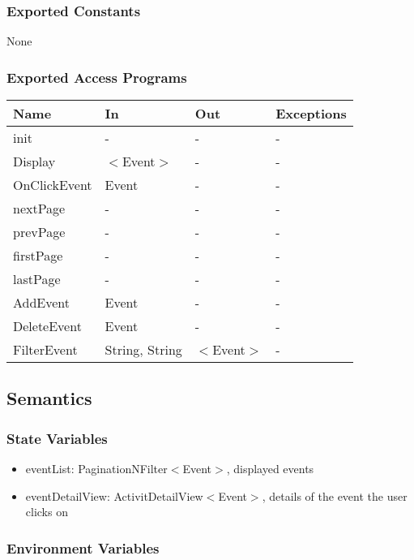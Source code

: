 \documentclass[12pt, titlepage]{article}
\begin{document}
\subsubsection{Exported Constants}
None

\subsubsection{Exported Access Programs}
\begin{center}
\begin{tabular}{p{4cm} p{2cm} p{4cm} p{4cm}}
\hline
\textbf{Name} & \textbf{In} & \textbf{Out} & \textbf{Exceptions} \\
\hline
init & - & - & -\\
Display & $<$Event$>$ & - & - \\
OnClickEvent & Event & - & -\\ 
nextPage & - & - &  -\\
prevPage & - & - &  -\\
firstPage & - & - &  -\\
lastPage & - & - &  -\\
AddEvent & Event & - & - \\
DeleteEvent & Event & - & - \\
FilterEvent & String, String & $<$Event$>$ & - \\
\hline
\end{tabular}
\end{center}

\subsection{Semantics}

\subsubsection{State Variables}

\begin{itemize}
\item eventList: PaginationNFilter$<$Event$>$, displayed events
\item eventDetailView: ActivitDetailView$<$Event$>$, details of the event the user clicks on
\end{itemize}

\subsubsection{Environment Variables}
\end{document}
